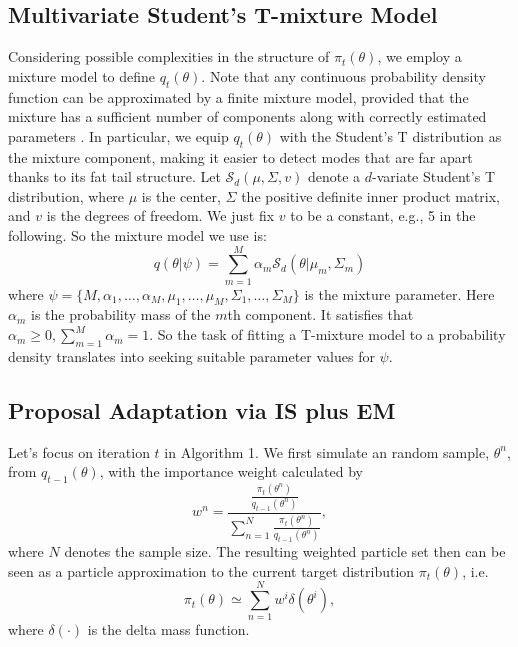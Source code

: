 \documentclass[aoas]{imsart}
\begin{document}
\subsection{Multivariate Student's T-mixture Model}
Considering possible complexities in the structure of
$\pi_t(\theta)$, we employ a mixture model to define
$q_{t}(\theta)$. Note that any continuous probability density
function can be approximated by a finite mixture model, provided
that the mixture has a sufficient number of components along with
correctly estimated parameters
\citep{bishop2005neural,zeevi1997det}. In particular, we equip
$q_{t}(\theta)$ with the Student's T distribution as the mixture
component, making it easier to detect modes that are far apart
thanks to its fat tail structure. Let $\mathcal{S}_d(\mu,\Sigma,v)$
denote a $d$-variate Student's T distribution, where $\mu$ is the
center, $\Sigma$ the positive definite inner product matrix, and $v$
is the degrees of freedom. We just fix $v$ to be a constant, e.g., 5
in the following. So the mixture model we use is:
\begin{equation}\label{Definition_mixture}
q(\theta|\psi)=\sum\limits_{m=1}^M \alpha_{m}
\mathcal{S}_d(\theta|\mu_m,\Sigma_m)
\end{equation}
where
$\psi=\{M,\alpha_1,\ldots,\alpha_M,\mu_1,\ldots,\mu_M,\Sigma_1,\ldots,\Sigma_M\}$
is the mixture parameter. Here $\alpha_m$ is the probability mass of
the $m$th component. It satisfies that $\alpha_{m}\geq
0,\sum_{m=1}^M \alpha_{m}=1$. So the task of fitting a T-mixture
model to a probability density translates into seeking suitable
parameter values for $\psi$.

\subsection {Proposal Adaptation via IS plus EM}\label{sec:IS_EM}
Let's focus on iteration $t$ in Algorithm 1. We first simulate an
random sample, $\theta^n$, from $q_{t-1}(\theta)$, with the
importance weight calculated by
\begin{equation}
w^n=\frac{\frac{\pi_{t}(\theta^n)}{q_{t-1}(\theta^n)}}{\sum_{n=1}^N\frac{\pi_{t}(\theta^n)}{q_{t-1}(\theta^n)}},
\end{equation}
where $N$ denotes the sample size. The resulting weighted particle
set then can be seen as a particle approximation to the current
target distribution $\pi_t(\theta)$, i.e.
\begin{equation}\label{delta_mass_approx}
\pi_t(\theta)\simeq\sum\limits_{n=1}^Nw^i\delta(\theta^i),
\end{equation}
where $\delta(\cdot)$ is the delta mass function.
\end{document}
